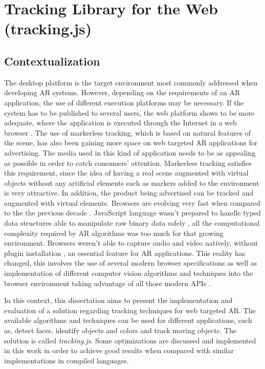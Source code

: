 \chapter{Tracking Library for the Web (tracking.js)} %
\label{cha:tracking_library_for_the_web}

\section{Contextualization} %
\label{sec:tracking_library_for_the_web:Contextualization}

The desktop platform is the target environment most commonly addressed when developing AR systems. However, depending on the requirements of an AR application, the use of different execution platforms may be necessary. If the system has to be published to several users, the web platform shows to be more adequate, where the application is executed through the Internet in a web browser \cite{Pablo2013}.
The use of markerless tracking, which is based on natural features of the scene, has also been gaining more space on web targeted AR applications for advertising. The media used in this kind of application needs to be as appealing as possible in order to catch consumers' attention. Markerless tracking satisfies this requirement, since the idea of having a real scene augmented with virtual objects without any artificial elements such as markers added to the environment is very attractive. In addition, the product being advertised can be tracked and augmented with virtual elements.
Browsers are evolving very fast when compared to the the previous decade \cite{Hickson2013}. JavaScript language \cite{International2009,MDN2013} wasn't prepared to handle typed data structures \cite{TypedArray2013} able to manipulate raw binary data safely \cite{Canvas2013}, all the computational complexity required by AR algorithms was too much for that growing environment. Browsers weren't able to capture audio and video \cite{MediaCapture2013,WebRTC2013} natively, without plugin installation \cite{Flash2013}, an essential feature for AR applications. This reality has changed, this involves the use of several modern browser specifications as well as implementation of different computer vision algorithms and techniques into the browser environment taking advantage of all those modern APIs \cite{Hickson2013,WC2006}.

In this context, this dissertation aims to present the implementation and evaluation of a solution regarding tracking techniques for web targeted AR. The available algorithms and techniques can be used for different applications, such as, detect faces, identify objects and colors and track moving objects. The solution is called \textit{tracking.js}. Some optimizations are discussed and implemented in this work in order to achieve good results when compared with similar implementations in compiled languages.

